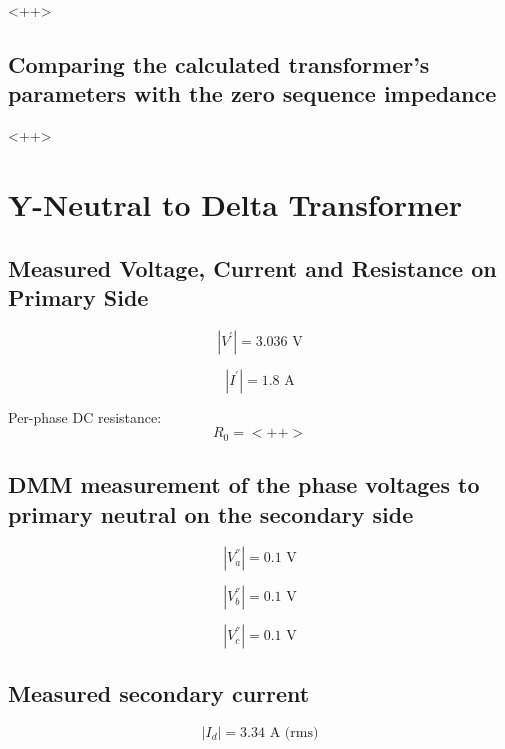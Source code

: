\documentclass{article}
\begin{document}
<++>

\subsection{Comparing the calculated transformer's parameters with the zero sequence impedance} 
<++>

\section{Y-Neutral to Delta Transformer} 

\subsection{Measured Voltage, Current and Resistance on Primary Side} 

\begin{equation}
  | V ^{'} | = 3.036 \text{ V}
\end{equation}

\begin{equation}
  | I ^{'} | = 1.8 \text{ A}
\end{equation}

Per-phase DC resistance:
\begin{equation}
  R_0 = <++>
\end{equation}

\subsection{DMM measurement of the phase voltages to primary neutral on the secondary side} 

\begin{equation}
  | V ^{''} _{a} | = 0.1 \text{ V}
\end{equation}

\begin{equation}
  | V ^{''} _{b} | = 0.1 \text{ V}
\end{equation}

\begin{equation}
  | V ^{''} _{c} | = 0.1 \text{ V}
\end{equation}

\subsection{Measured secondary current} 

\begin{equation}
  | I _{d} | = 3.34 \text{ A (rms)} 
\end{equation}
\end{document}
